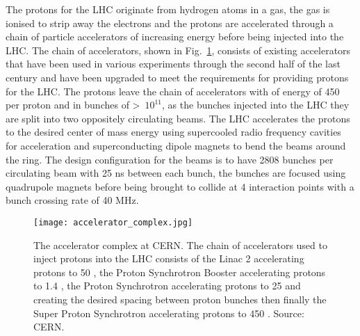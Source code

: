 The protons for the LHC originate from hydrogen atoms in a gas, the gas is ionised to strip away the electrons and the protons are accelerated through a chain of particle accelerators of increasing energy before being injected into the LHC. The chain of accelerators, shown in Fig.~\ref{fig:accelerator_chain}, consists of existing accelerators that have been used in various experiments through the second half of the last century and have been upgraded to meet the requirements for providing protons for the LHC. 
The protons leave the chain of accelerators with of energy of 450 \gev per proton and in bunches of >~$10^{11}$, as the bunches injected into the LHC they are split into two oppositely circulating beams.
The LHC accelerates the protons to the desired center of mass energy using supercooled radio frequency cavities for acceleration and superconducting dipole magnets to bend the beams around the ring. 
The design configuration for the beams is to have 2808 bunches per circulating beam with 25 ns between each bunch, the bunches are focused using quadrupole magnets before being brought to collide at 4 interaction points with a bunch crossing rate of 40 MHz. 


\begin{figure}[htbp!] 
  \centering    
  \texttt{[image: accelerator\_complex.jpg]}
  \caption{The accelerator complex at CERN. The chain of accelerators used to inject protons into the LHC consists of the Linac 2 accelerating protons to 50 \mev, the Proton Synchrotron Booster accelerating protons to 1.4 \gev, the Proton Synchrotron accelerating protons to 25 \gev and creating the desired spacing between proton bunches then finally the Super Proton Synchrotron accelerating protons to 450 \gev. Source: CERN.}
  \label{fig:accelerator_chain}
\end{figure}
